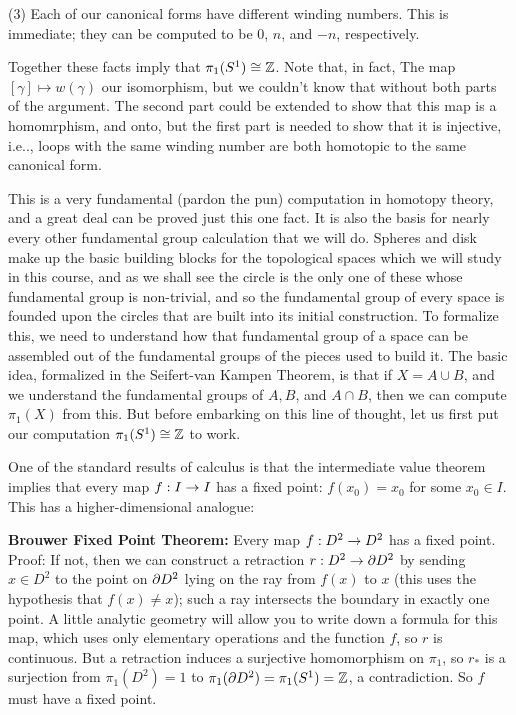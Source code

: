 \ssk

(3) Each of our canonical forms have different winding numbers. This is immediate;
they can be computed to be $0$, $n$, and $-n$, respectively.

\msk

Together these facts imply that $\pi_1(S^1)\cong {\Bbb Z}$. Note that, in fact, The map
$[\gamma]\mapsto w(\gamma)$  our isomorphism, but we couldn't know that
without both parts of the argument. The second part could be extended to show that
this map is a homomrphism, and onto, but the first part is needed to show that it 
is injective, i.e.., loops with the same winding number are both homotopic to the
same canonical form.

\msk

This is a very fundamental (pardon the pun) computation in homotopy theory, and 
a great deal can be proved just this one fact. It is also the basis for nearly 
every other fundamental group calculation that we will do. Spheres and disk make up the
basic building blocks for the topological spaces which we will study in this course,
and as we shall see the circle is the only one of these whose fundamental group 
is non-trivial, and so the fundamental group of every space is founded upon the
circles that are built into its initial construction. To formalize this, we 
need to understand how that fundamental group of a space can be assembled out of
the fundamental groups of the pieces used to build it. The basic idea, formalized
in the Seifert-van Kampen Theorem, is that if $X=A\cup B$, and we understand 
the fundamental groups of $A, B$, and $A\cap B$, then we can compute $\pi_1(X)$
from this. But before embarking on this line of thought, let us first put our
computation $\pi_1(S^1)\cong {\Bbb Z}$ to work.

\msk

One of the standard results of calculus is that the intermediate value theorem 
implies that every map $f:I\rightarrow I$ has a fixed point: $f(x_0)=x_0$ for some
$x_0\in I$. This has a higher-dimensional analogue:

\ssk

{\bf Brouwer Fixed Point Theorem:} Every map $f:D^2\rightarrow D^2$ has a fixed point.
Proof: If not, then we can construct a retraction $r:D^2\rightarrow \partial D^2$ by
sending $x\in D^2$ to the point on $\partial D^2$ lying on the ray from $f(x)$ to $x$
(this uses the hypothesis that $f(x)\neq x$);
such a ray intersects the boundary in exactly one point. A little analytic
geometry will allow you to write down a formula for this map, which uses
only elementary operations and the function $f$, so $r$ is continuous.
But a retraction induces a surjective homomorphism on $\pi_1$, so $r_*$
is a surjection from $\pi_1(D^2)=1$ to $\pi_1(\partial D^2)=\pi_1(S^1)={\Bbb Z}$,
a contradiction. So $f$ must have a fixed point.


